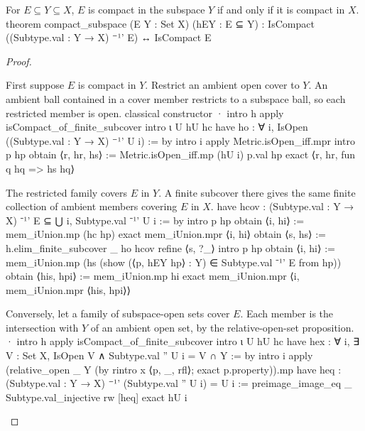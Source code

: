 \begin{proposition} \label{an1:thm:compactness-preserved-under-subspace}
  \begin{lean}{For $E\subseteq Y\subseteq X$, $E$ is compact in the subspace $Y$ if and only if it is compact in $X$.}
    theorem compact_subspace (E Y : Set X) (hEY : E ⊆ Y) :
        IsCompact ((Subtype.val : Y → X) ⁻¹' E) ↔ IsCompact E
  \end{lean}
\end{proposition}

\begin{proof}
  \begin{lean}{First suppose $E$ is compact in $Y$. Restrict an ambient open cover to $Y$. An ambient ball contained in a cover member restricts to a subspace ball, so each restricted member is open.}
    classical
    constructor
    · intro h
      apply isCompact_of_finite_subcover
      intro ι U hU hc
      have ho : ∀ i, IsOpen ((Subtype.val : Y → X) ⁻¹' U i) := by
        intro i
        apply Metric.isOpen_iff.mpr
        intro p hp
        obtain ⟨r, hr, hs⟩ := Metric.isOpen_iff.mp (hU i) p.val hp
        exact ⟨r, hr, fun q hq => hs hq⟩
  \end{lean}

  \begin{lean}{The restricted family covers $E$ in $Y$. A finite subcover there gives the same finite collection of ambient members covering $E$ in $X$.}
    have hcov : (Subtype.val : Y → X) ⁻¹' E ⊆ ⋃ i, Subtype.val ⁻¹' U i := by
      intro p hp
      obtain ⟨i, hi⟩ := mem_iUnion.mp (hc hp)
      exact mem_iUnion.mpr ⟨i, hi⟩
    obtain ⟨s, hs⟩ := h.elim_finite_subcover _ ho hcov
    refine ⟨s, ?_⟩
    intro p hp
    obtain ⟨i, hi⟩ := mem_iUnion.mp (hs (show (⟨p, hEY hp⟩ : Y) ∈ Subtype.val ⁻¹' E from hp))
    obtain ⟨his, hpi⟩ := mem_iUnion.mp hi
    exact mem_iUnion.mpr ⟨i, mem_iUnion.mpr ⟨his, hpi⟩⟩
  \end{lean}

  \begin{lean}{Conversely, let a family of subspace-open sets cover $E$. Each member is the intersection with $Y$ of an ambient open set, by the relative-open-set proposition.}
    · intro h
      apply isCompact_of_finite_subcover
      intro ι U hU hc
      have hex : ∀ i, ∃ V : Set X, IsOpen V ∧ Subtype.val '' U i = V ∩ Y := by
        intro i
        apply (relative_open _ Y (by rintro x ⟨p, _, rfl⟩; exact p.property)).mp
        have heq : (Subtype.val : Y → X) ⁻¹' (Subtype.val '' U i) = U i :=
          preimage_image_eq _ Subtype.val_injective
        rw [heq]
        exact hU i
  \end{lean}


\end{proof}
